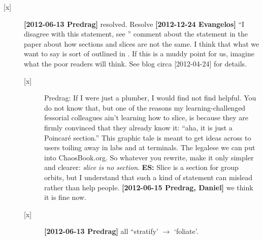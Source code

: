 \begin{description}
\begin{description}
\item[{[x]}] {\bf [2012-06-13 Predrag]} resolved. Resolve {\bf [2012-12-24 Evangelos]}
``I disagree with this statement,
see ''
comment about the statement in the paper about how sections and slices
are not the same. I think that what we want to say is sort of outlined in
. If this is a muddy point for us, imagine
what the poor readers will think. See blog circa [2012-04-24] for
details.
		\begin{description}
			\item[{[x]}] Predrag: If I were just a plumber, I would find
                    not find  helpful. You do
                    not know that, but one of the reasons my
                    learning-challenged fessorial colleagues ain't
                    learning how to slice, is because they are firmly
                    convinced that they already know it: ``aha, it is
                    just a Poincar\'e section.'' This graphic tale is
                    meant to get ideas across to users toiling away in
                    labs and at terminals. The legalese we can put into
                    ChaosBook.org. So whatever you rewrite, make it only
                    simpler and clearer: \emph{slice is no section}.
					{\bf ES:} Slice is a section for group orbits, but
					I understand that such a kind of statement can mislead
					rather than help people.
{\bf [2012-06-15 Predrag, Daniel]} we think it is fine now.
          \item[{[x]}] {\bf [2012-06-13 Predrag]} all ``stratify' $\to$ `foliate'.

        \end{description}


\end{description}
\end{description}
